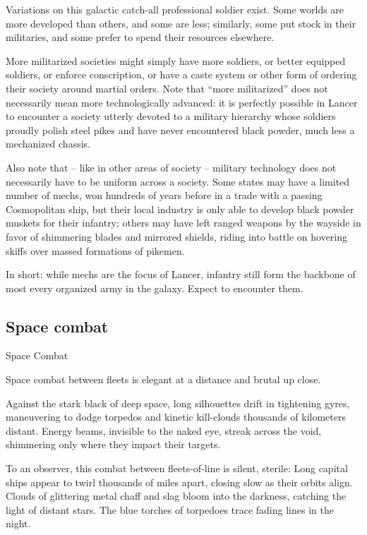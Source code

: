 Variations on this galactic catch-all professional soldier exist. Some worlds are more developed  
than others, and some are less; similarly, some put stock in their militaries, and some prefer to  
spend their resources elsewhere. 
 

More militarized societies might simply have more soldiers, or better equipped soldiers, or  
enforce conscription, or have a caste system or other form of ordering their society around  
martial orders. Note that “more militarized” does not necessarily mean more technologically  
advanced: it is perfectly possible in Lancer to encounter a society utterly devoted to a military  
hierarchy whose soldiers proudly polish steel pikes and have never encountered black powder,  
much less a mechanized chassis. 
 

Also note that -- like in other areas of society -- military technology does not necessarily have to  
be uniform across a society. Some states may have a limited number of mechs, won hundreds of  
years before in a trade with a passing Cosmopolitan ship, but their local industry is only able to  
develop black powder muskets for their infantry; others may have left ranged weapons by the  
wayside in favor of shimmering blades and mirrored shields, riding into battle on hovering skiffs  
over massed formations of pikemen.
 

In short: while mechs are the focus of Lancer, infantry still form the backbone of most every  
organized army in the galaxy. Expect to encounter them.   
 
\subsection{Space combat}
Space Combat  

Space combat between fleets is elegant at a distance and brutal up close.
 

Against the stark black of deep space, long silhouettes drift in tightening gyres, maneuvering to  
dodge torpedos and kinetic kill-clouds thousands of kilometers distant. Energy beams, invisible  
to the naked eye, streak across the void, shimmering only where they impact their targets. 
 

To an observer, this combat between fleets-of-line is silent, sterile: Long capital ships appear to  
twirl thousands of miles apart, closing slow as their orbits align. Clouds of glittering metal chaff  
and slag bloom into the darkness, catching the light of distant stars. The blue torches of  
torpedoes trace fading lines in the night. 
 

